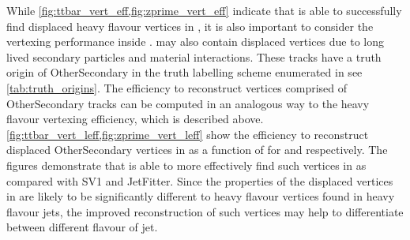 While \cref{fig:ttbar_vert_eff,fig:zprime_vert_eff} indicate that \GNN is able to successfully find displaced heavy flavour vertices in \bjets, it is also important to consider the vertexing performance inside \ljets.
\ljets may also contain displaced vertices due to long lived secondary particles and material interactions.
These tracks have a truth origin of OtherSecondary in the truth labelling scheme enumerated in see \cref{tab:truth_origins}.
The efficiency to reconstruct vertices comprised of OtherSecondary tracks can be computed in an analogous way to the heavy flavour vertexing efficiency, which is described above.
\cref{fig:ttbar_vert_leff,fig:zprime_vert_leff} show the efficiency to reconstruct displaced OtherSecondary vertices in \ljets as a function of \pt for \ttbarjets and \Zprimejets respectively.
The figures demonstrate that \GNN is able to more effectively find such vertices in \ljets as compared with SV1 and JetFitter.
Since the properties of the displaced vertices in \ljets are likely to be significantly different to heavy flavour vertices found in heavy flavour jets, the improved reconstruction of such vertices may help to differentiate between different flavour of jet.

